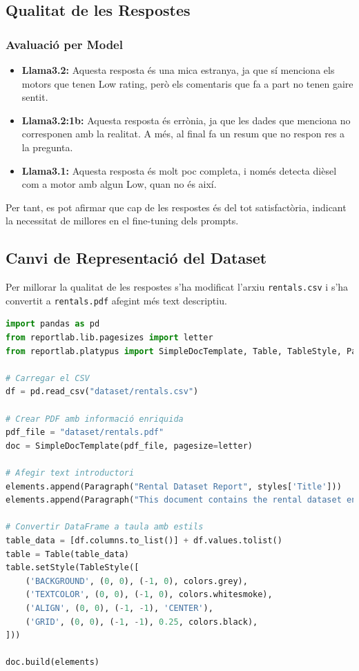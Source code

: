 \documentclass[12pt,a4paper]{article}
\begin{document}
\subsection{Qualitat de les Respostes}

\subsubsection{Avaluació per Model}

\begin{itemize}
    \item \textbf{Llama3.2:} Aquesta resposta és una mica estranya, ja que sí menciona els motors que tenen Low rating, però els comentaris que fa a part no tenen gaire sentit.
    
    \item \textbf{Llama3.2:1b:} Aquesta resposta és errònia, ja que les dades que menciona no corresponen amb la realitat. A més, al final fa un resum que no respon res a la pregunta.
    
    \item \textbf{Llama3.1:} Aquesta resposta és molt poc completa, i només detecta dièsel com a motor amb algun Low, quan no és així.
\end{itemize}

Per tant, es pot afirmar que cap de les respostes és del tot satisfactòria, indicant la necessitat de millores en el fine-tuning dels prompts.

\subsection{Canvi de Representació del Dataset}

Per millorar la qualitat de les respostes s'ha modificat l'arxiu \texttt{rentals.csv} i s'ha convertit a \texttt{rentals.pdf} afegint més text descriptiu.

\begin{lstlisting}[language=Python,caption=Conversió de CSV a PDF amb ReportLab]
import pandas as pd
from reportlab.lib.pagesizes import letter
from reportlab.platypus import SimpleDocTemplate, Table, TableStyle, Paragraph, Spacer

# Carregar el CSV
df = pd.read_csv("dataset/rentals.csv")

# Crear PDF amb informació enriquida
pdf_file = "dataset/rentals.pdf"
doc = SimpleDocTemplate(pdf_file, pagesize=letter)

# Afegir text introductori
elements.append(Paragraph("Rental Dataset Report", styles['Title']))
elements.append(Paragraph("This document contains the rental dataset enriched with additional information for analysis.", styles['Normal']))

# Convertir DataFrame a taula amb estils
table_data = [df.columns.to_list()] + df.values.tolist()
table = Table(table_data)
table.setStyle(TableStyle([
    ('BACKGROUND', (0, 0), (-1, 0), colors.grey),
    ('TEXTCOLOR', (0, 0), (-1, 0), colors.whitesmoke),
    ('ALIGN', (0, 0), (-1, -1), 'CENTER'),
    ('GRID', (0, 0), (-1, -1), 0.25, colors.black),
]))

doc.build(elements)
\end{lstlisting}
\end{document}
